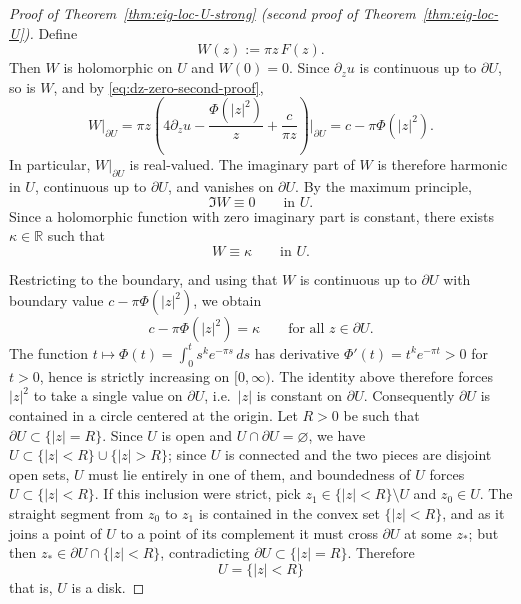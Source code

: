 \documentclass[a4paper,11pt,reqno]{amsart}
\numberwithin{equation}{section}
\theoremstyle{plain} %
\theoremstyle{definition} %
\theoremstyle{remark}
\newcommand{\R}{\mathbb{R}}
\begin{document}
\begin{proof}[Proof of Theorem~\ref{thm:eig-loc-U-strong} (second proof of Theorem~\ref{thm:eig-loc-U})]
Define
\[
W(z):=\pi z\,F(z).
\]
Then \(W\) is holomorphic on \(U\) and \(W(0)=0\). Since \(\partial_z u\) is continuous up to
\(\partial U\), so is \(W\), and by \eqref{eq:dz-zero-second-proof},
\[
W|_{\partial U}
=
\pi z\left(4\partial_z u-\frac{\Phi(|z|^2)}{z}+\frac{c}{\pi z}\right)\Big|_{\partial U}
=
c-\pi\Phi(|z|^2).
\]
In particular, \(W|_{\partial U}\) is real-valued. The imaginary part of \(W\) is therefore
harmonic in \(U\), continuous up to \(\partial U\), and vanishes on \(\partial U\). By the
maximum principle,
\[
\Im W\equiv 0
\qquad\text{in }U.
\]
Since a holomorphic function with zero imaginary part is constant, there exists \(\kappa\in\R\)
such that
\[
W\equiv \kappa
\qquad\text{in }U.
\]

Restricting to the boundary, and using that \(W\) is continuous up to \(\partial U\) with
boundary value \(c-\pi\Phi(|z|^2)\), we obtain
\[
c-\pi\Phi(|z|^2)=\kappa
\qquad\text{for all }z\in\partial U.
\]
The function \(t\mapsto \Phi(t)=\int_0^t s^k e^{-\pi s}\,ds\) has derivative
\(\Phi'(t)=t^k e^{-\pi t}>0\) for \(t>0\), hence is strictly increasing on \([0,\infty)\). The
identity above therefore forces \(|z|^2\) to take a single value on \(\partial U\), i.e.\ \(|z|\)
is constant on \(\partial U\). Consequently \(\partial U\) is contained in a circle centered at
the origin. Let \(R>0\) be such that \(\partial U\subset \{|z|=R\}\). Since \(U\) is open and
\(U\cap\partial U=\varnothing\), we have \(U\subset \{|z|<R\}\cup\{|z|>R\}\); since \(U\) is
connected and the two pieces are disjoint open sets, \(U\) must lie entirely in one of them, and
boundedness of \(U\) forces \(U\subset \{|z|<R\}\). If this inclusion were strict, pick
\(z_1\in\{|z|<R\}\setminus U\) and \(z_0\in U\). The straight segment from \(z_0\) to \(z_1\) is
contained in the convex set \(\{|z|<R\}\), and as it joins a point of \(U\) to a point of its
complement it must cross \(\partial U\) at some \(z_*\); but then \(z_*\in\partial U\cap\{|z|<R\}\),
contradicting \(\partial U\subset \{|z|=R\}\). Therefore
\[
U=\{|z|<R\}
\]
that is, \(U\) is a disk.
\end{proof}
\end{document}
